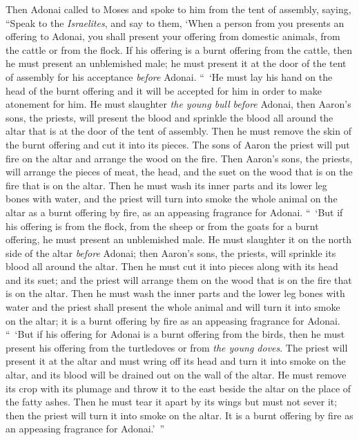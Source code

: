
\begin{biblechapter} %
 Then Adonai called to Moses and spoke to him from the tent of assembly, saying,
\verse “Speak to the \textit{Israelites}, and say to them, ‘When a person from you presents an offering to Adonai, you shall present your offering from domestic animals, from the cattle or from the flock.
\verse If his offering is a burnt offering from the cattle, then he must present an unblemished male; he must present it at the door of the tent of assembly for his acceptance \textit{before} Adonai.
\verse “ ‘He must lay his hand on the head of the burnt offering and it will be accepted for him in order to make atonement for him.
\verse He must slaughter \textit{the young bull} \textit{before} Adonai, then Aaron’s sons, the priests, will present the blood and sprinkle the blood all around the altar that is at the door of the tent of assembly.
\verse Then he must remove the skin of the burnt offering and cut it into its pieces.
\verse The sons of Aaron the priest will put fire on the altar and arrange the wood on the fire.
\verse Then Aaron’s sons, the priests, will arrange the pieces of meat, the head, and the suet on the wood that is on the fire that is on the altar.
\verse Then he must wash its inner parts and its lower leg bones with water, and the priest will turn into smoke the whole animal on the altar as a burnt offering by fire, as an appeasing fragrance for Adonai.
\verse “ ‘But if his offering is from the flock, from the sheep or from the goats for a burnt offering, he must present an unblemished male.
\verse He must slaughter it on the north side of the altar \textit{before} Adonai; then Aaron’s sons, the priests, will sprinkle its blood all around the altar.
\verse Then he must cut it into pieces along with its head and its suet; and the priest will arrange them on the wood that is on the fire that is on the altar.
\verse Then he must wash the inner parts and the lower leg bones with water and the priest shall present the whole animal and will turn it into smoke on the altar; it is a burnt offering by fire as an appeasing fragrance for Adonai.
\verse “ ‘But if his offering for Adonai is a burnt offering from the birds, then he must present his offering from the turtledoves or from \textit{the young doves}.
\verse The priest will present it at the altar and must wring off its head and turn it into smoke on the altar, and its blood will be drained out on the wall of the altar.
\verse He must remove its crop with its plumage and throw it to the east beside the altar on the place of the fatty ashes.
\verse Then he must tear it apart by its wings but must not sever it; then the priest will turn it into smoke on the altar. It is a burnt offering by fire as an appeasing fragrance for Adonai.’ ”
\end{biblechapter}

